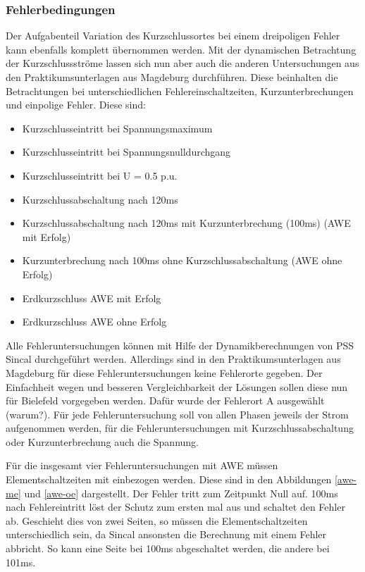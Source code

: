 \documentclass{scrartcl}
\begin{document}
\begin{onehalfspace}
\subsubsection{Fehlerbedingungen}
Der Aufgabenteil \glqq Variation des Kurzschlussortes bei einem dreipoligen Fehler\grqq{} kann ebenfalls komplett übernommen werden. Mit der dynamischen Betrachtung der Kurzschlussströme lassen sich nun aber auch die anderen Untersuchungen aus den Praktikumsunterlagen aus Magdeburg durchführen. Diese beinhalten die Betrachtungen bei unterschiedlichen Fehlereinschaltzeiten, Kurzunterbrechungen und einpolige Fehler. Diese sind:

\begin{itemize}
\item Kurzschlusseintritt bei Spannungsmaximum
\item Kurzschlusseintritt bei Spannungsnulldurchgang
\item Kurzschlusseintritt bei U = 0.5 p.u.
\item Kurzschlussabschaltung nach 120ms
\item Kurzschlussabschaltung nach 120ms mit Kurzunterbrechung (100ms) (AWE mit Erfolg)
\item Kurzunterbrechung nach 100ms ohne Kurzschlussabschaltung (AWE ohne Erfolg)
\item Erdkurzschluss AWE mit Erfolg
\item Erdkurzschluss AWE ohne Erfolg
\end{itemize}

Alle Fehleruntersuchungen können mit Hilfe der Dynamikberechnungen von PSS Sincal durchgeführt werden. Allerdings sind in den Praktikumsunterlagen aus Magdeburg für diese Fehleruntersuchungen keine Fehlerorte gegeben. Der Einfachheit wegen und besseren Vergleichbarkeit der Lösungen sollen diese nun für Bielefeld vorgegeben werden. Dafür wurde der Fehlerort A ausgewählt (warum?). Für jede Fehleruntersuchung soll von allen Phasen jeweils der Strom aufgenommen werden, für die Fehleruntersuchungen mit Kurzschlussabschaltung oder Kurzunterbrechung auch die Spannung.

Für die insgesamt vier Fehleruntersuchungen mit AWE müssen Elementschaltzeiten mit einbezogen werden. Diese sind in den Abbildungen \ref{awe-me} und \ref{awe-oe} dargestellt. Der Fehler tritt zum Zeitpunkt Null auf. 100ms nach Fehlereintritt löst der Schutz zum ersten mal aus und schaltet den Fehler ab. Geschieht dies von zwei Seiten, so müssen die Elementschaltzeiten unterschiedlich sein, da Sincal ansonsten die Berechnung mit einem Fehler abbricht. So kann eine Seite bei 100ms abgeschaltet werden, die andere bei 101ms.


\end{onehalfspace}
\end{document}

